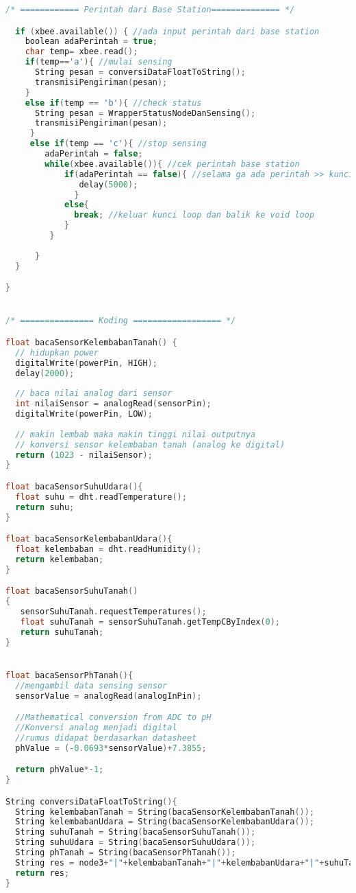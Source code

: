 \begin{lstlisting}[language=C++, caption=Node.ino]
/* ============ Perintah dari Base Station============== */

  if (xbee.available()) { //ada input perintah dari base station
    boolean adaPerintah = true;
    char temp= xbee.read();
    if(temp=='a'){ //mulai sensing
      String pesan = conversiDataFloatToString();
      transmisiPengiriman(pesan);
    }
    else if(temp == 'b'){ //check status
      String pesan = WrapperStatusNodeDanSensing();
      transmisiPengiriman(pesan);
     }
     else if(temp == 'c'){ //stop sensing
        adaPerintah = false;
        while(xbee.available()){ //cek perintah base station
            if(adaPerintah == false){ //selama ga ada perintah >> kunci loop
               delay(5000);
              }
            else{
              break; //keluar kunci loop dan balik ke void loop
            }
         } 
        
      }
  }

}


/* =============== Koding ================== */

float bacaSensorKelembabanTanah() {
  // hidupkan power
  digitalWrite(powerPin, HIGH);
  delay(2000);
  
  // baca nilai analog dari sensor
  int nilaiSensor = analogRead(sensorPin);
  digitalWrite(powerPin, LOW);
  
  // makin lembab maka makin tinggi nilai outputnya
  // konversi sensor kelembaban tanah (analog ke digital)
  return (1023 - nilaiSensor);
}

float bacaSensorSuhuUdara(){
  float suhu = dht.readTemperature();
  return suhu;
}

float bacaSensorKelembabanUdara(){
  float kelembaban = dht.readHumidity();
  return kelembaban;
}

float bacaSensorSuhuTanah()
{
   sensorSuhuTanah.requestTemperatures();
   float suhuTanah = sensorSuhuTanah.getTempCByIndex(0);
   return suhuTanah;   
}


float bacaSensorPhTanah(){
  //mengambil data sensing sensor
  sensorValue = analogRead(analogInPin);

  //Mathematical conversion from ADC to pH
  //Konversi analog menjadi digital
  //rumus didapat berdasarkan datasheet 
  phValue = (-0.0693*sensorValue)+7.3855;

  return phValue*-1;
}

String conversiDataFloatToString(){
  String kelembabanTanah = String(bacaSensorKelembabanTanah());
  String kelembabanUdara = String(bacaSensorKelembabanUdara());
  String suhuTanah = String(bacaSensorSuhuTanah());
  String suhuUdara = String(bacaSensorSuhuUdara());
  String phTanah = String(bacaSensorPhTanah());
  String res = node3+"|"+kelembabanTanah+"|"+kelembabanUdara+"|"+suhuTanah+"|"+suhuUdara+"|"+phTanah+"|"+WrapperStatusNodeDanSensing();
  return res;
}



\end{lstlisting}
